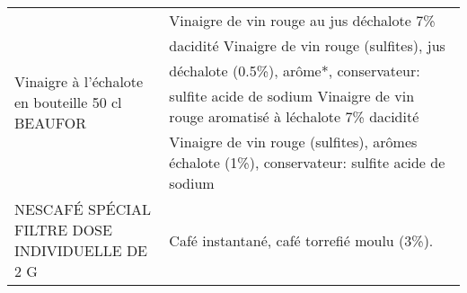 \begin{longtable}{p{5cm}p{10cm}}
                                                         Vinaigre à l'échalote en bouteille 50 cl BEAUFOR &                                                                                                                                                                                                                                                                                                                                                                                                                                                                                                                                                                                                                                                                                                                   Vinaigre de vin rouge au jus déchalote 7\% dacidité  Vinaigre de vin rouge (sulfites), jus déchalote (0.5\%), arôme*, conservateur: sulfite acide de sodium  Vinaigre de vin rouge aromatisé à léchalote 7\% dacidité  Vinaigre de vin rouge (sulfites), arômes échalote (1\%), conservateur: sulfite acide de sodium \\
                                                          NESCAFÉ SPÉCIAL FILTRE DOSE INDIVIDUELLE DE 2 G &                                                                                                                                                                                                                                                                                                                                                                                                                                                                                                                                                                                                                                                                                                                                                                                                                                                                                                                                                                                               Café instantané, café torrefié moulu (3\%). \\

\end{longtable}
